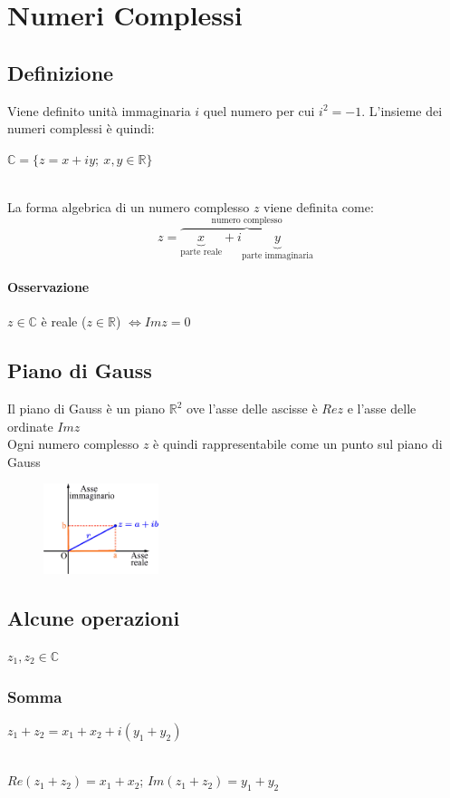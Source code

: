 \chapter{Numeri Complessi}
\section{Definizione}
Viene definito unità immaginaria $i$ quel numero per cui $i^2 = -1$.
L'insieme dei numeri complessi è quindi:\\
\begin{Large}
$\mathbb{C} = \{z = x + iy;\ x,y \in \mathbb{R}\}$
\end{Large}\\
La forma algebrica di un numero complesso $z$ viene definita come:
\[
z = \overbrace{
	\underbrace{x}_\text{parte reale} + i
	\underbrace{y}_\text{parte immaginaria}
}^\text{numero complesso}
\]
\subsubsection{Osservazione}
$z \in \mathbb{C}$ è reale ($z \in \mathbb{R}$) $\iff Imz = 0$

\section{Piano di Gauss}
Il piano di Gauss è un piano $\mathbb{R}^2$ ove l'asse delle ascisse è $Rez$ e l'asse delle ordinate $Imz$\\
Ogni numero complesso $z$ è quindi rappresentabile come un punto sul piano di Gauss\\
\begin{figure}[htbp]
	\centering
	\includegraphics[width=0.3\textwidth]{images/piano_gauss.png}
\end{figure}

\section{Alcune operazioni}
$z_1,z_2 \in \mathbb{C}$
\subsection{Somma}
\begin{Large}
$z_1+z_2 = x_1+x_2+i(y_1+y_2)$ 
\end{Large}\\
$Re(z_1+z_2) = x_1+x_2$;   $Im(z_1+z_2) = y_1+y_2$
